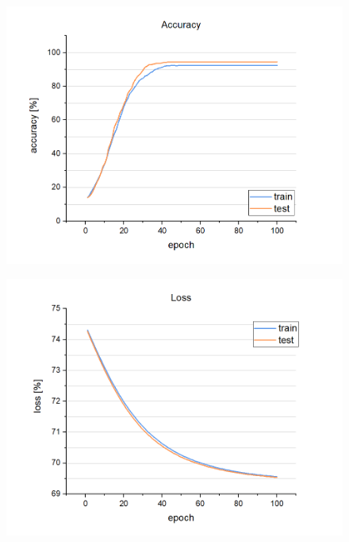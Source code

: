 \begin{figure}[!hbt]
    \centering
    \begin{minipage}{.5\textwidth}
        \centering
        \includegraphics[width=\linewidth]{resources/accuracy.png}
        \captionsetup{width=\linewidth}
        \label{fig:accuracy}
    \end{minipage}%
    \begin{minipage}{.5\textwidth}
        \centering
        \includegraphics[width=\linewidth]{resources/loss.png}
        \captionsetup{width=\linewidth}
        \label{fig:loss}
    \end{minipage}
\end{figure}

